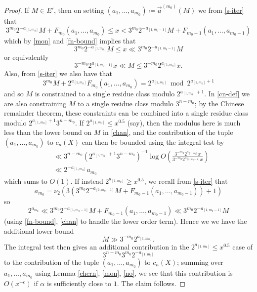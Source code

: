 \documentclass[12pt,a4paper,reqno]{amsart}
\numberwithin{equation}{section}
\theoremstyle{plain}
\theoremstyle{definition}
\renewcommand{\mod}{\bmod}
\begin{document}
\begin{proof}  If $M \in E'$, then on setting $(a_1,\dots,a_{m_0}) \coloneqq \vec a^{(m_0)}(M)$ we from \eqref{s-iter} that
$$ 
3^{m_0} 2^{-a_{[1,m_0]}} M + F_{m_0}(a_1,\dots,a_{m_0}) \leq x < 3^{m_0} 2^{-a_{[1,m_0-1]}} M + F_{m_0-1}(a_1,\dots,a_{m_0-1}) $$
which by \eqref{mon} and \eqref{fn-bound}
implies that
$$ 
3^{m_0} 2^{-a_{[1,m_0]}} M  \leq x \ll 3^{m_0} 2^{-a_{[1,m_0-1]}} M$$
or equivalently
\begin{equation}\label{chan}
3^{-m_0} 2^{a_{[1,m_0-1]}} x \ll M \leq 3^{-m_0} 2^{a_{[1,m_0]}} x.
\end{equation}
Also, from \eqref{s-iter} we also have that
$$ 3^{m_0} M + 2^{a_{[1,m_0]}} F_{m_0}(a_1,\dots,a_{m_0}) = 2^{a_{[1,m_0]}} \mod 2^{a_{[1,m_0]}+1} $$
and so $M$ is constrained to a single residue class modulo $2^{a_{[1,m_0]}+1}$.   In \eqref{cn-def} we are also constraining $M$ to a single residue class modulo $3^{n-m_0}$; by the Chinese remainder theorem, these constraints can be combined into a single residue class modulo $2^{a_{[1,m_0]}+1} 3^{n-m_0}$.  If $2^{a_{[1,m_0]}} \leq x^{0.5}$ (say), then the modulus here is much less than the lower bound on $M$ in \eqref{chan}, and the contribution of the tuple $(a_1,\dots,a_{m_0})$ to $c_n(X)$ can then be bounded using the integral test by
\begin{align*}
& \ll 3^{n-m_0} (2^{a_{[1,m_0]}+1} 3^{n-m_0})^{-1} \log O\left( \frac{3^{-m_0} 2^{a_{[1,m_0]}} x}{3^{-m_0} 2^{a_{[1,m_0-1]}} x } \right)\\
&\ll 2^{-a_{[1,m_0]}} a_{m_0}
\end{align*}
which sums to $O(1)$.  If instead $2^{a_{[1,m_0]}} \geq x^{0.5}$, we recall from \eqref{s-iter} that
$$ a_{m_0} = \nu_2\left( 3 (3^{m_0} 2^{-a_{[1,m_0-1]}} M + F_{m_0-1}(a_1,\dots,a_{m_0-1})) + 1\right)$$
so
$$ 2^{a_{m_0}} \ll 3^{m_0} 2^{-a_{[1,m_0-1]}} M + F_{m_0-1}(a_1,\dots,a_{m_0-1}) \ll  3^{m_0} 2^{-a_{[1,m_0-1]}} M$$
(using \eqref{fn-bound}, \eqref{chan} to handle the lower order term).  Hence we we have the additional lower bound
$$ M \gg 3^{-m_0} 2^{a_{[1,m_0]}}.$$
The integral test then gives an additional contribution in the $2^{a_{[1,m_0]}} \leq x^{0.5}$ case of
 $$ 3^{n-m_0} 3^{m_0} 2^{-a_{[1,m_0]}}$$
to the contribution of the tuple $(a_1,\dots,a_{m_0})$ to $c_n(X)$; summing over $a_1,\dots,a_{m_0}$ using Lemma \ref{chern}, \eqref{mon}, \eqref{no}, we see that this contribution is $O( x^{-c} )$ if $\alpha$ is sufficiently close to $1$.  The claim follows.
\end{proof}
\end{document}
